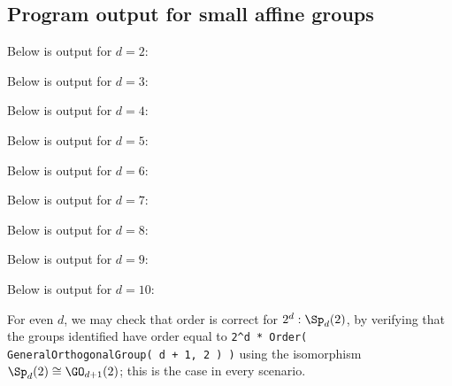 


% 

\subsection{Program output for small affine groups}\label{app:agl_output}

Below is output for $d = 2$:



Below is output for $d = 3$:



Below is output for $d = 4$:



Below is output for $d = 5$:



Below is output for $d = 6$:



Below is output for $d = 7$:



Below is output for $d = 8$:



Below is output for $d = 9$:



Below is output for $d = 10$:



For even $d$, we may check that order is correct for $2^d : \Sp_d(2)$, by verifying that the groups identified have order equal to \texttt{2\^{}d * Order( GeneralOrthogonalGroup( d + 1, 2 ) )} using the isomorphism $\Sp_d(2) \cong \GO_{d+1}(2)$; this is the case in every scenario.

% 